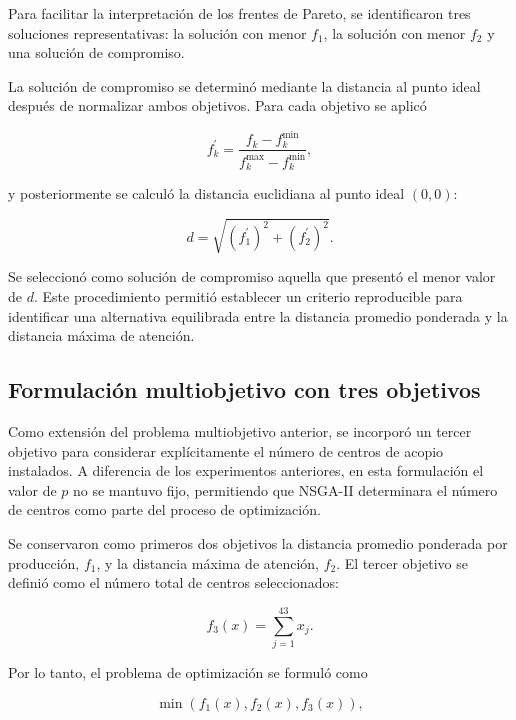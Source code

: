 \documentclass[journal]{IEEEtran}
\begin{document}
Para facilitar la interpretación de los frentes de Pareto, se identificaron tres soluciones representativas: la solución con menor $f_1$, la solución con menor $f_2$ y una solución de compromiso.

La solución de compromiso se determinó mediante la distancia al punto ideal después de normalizar ambos objetivos. Para cada objetivo se aplicó

\begin{equation}
	f_k^{\prime}=
	\frac{
		f_k-f_k^{\min}
	}{
		f_k^{\max}-f_k^{\min}
	},
\end{equation}

y posteriormente se calculó la distancia euclidiana al punto ideal $(0,0)$:

\begin{equation}
	d=
	\sqrt{
		(f_1^{\prime})^2+
		(f_2^{\prime})^2
	}.
\end{equation}

Se seleccionó como solución de compromiso aquella que presentó el menor valor de $d$. Este procedimiento permitió establecer un criterio reproducible para identificar una alternativa equilibrada entre la distancia promedio ponderada y la distancia máxima de atención.

\subsection{Formulación multiobjetivo con tres objetivos}

Como extensión del problema multiobjetivo anterior, se incorporó un tercer objetivo para considerar explícitamente el número de centros de acopio instalados. A diferencia de los experimentos anteriores, en esta formulación el valor de $p$ no se mantuvo fijo, permitiendo que NSGA-II determinara el número de centros como parte del proceso de optimización.

Se conservaron como primeros dos objetivos la distancia promedio ponderada por producción, $f_1$, y la distancia máxima de atención, $f_2$. El tercer objetivo se definió como el número total de centros seleccionados:

\begin{equation}
	f_3(x)=\sum_{j=1}^{43}x_j.
\end{equation}

Por lo tanto, el problema de optimización se formuló como

\begin{equation}
	\min \left(f_1(x),f_2(x),f_3(x)\right),
\end{equation}
\end{document}
